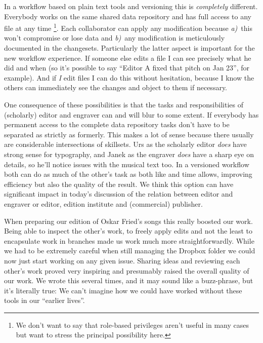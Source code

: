 \documentclass[11pt,a4paper]{article}
\begin{document}
In a workflow based on plain text tools and versioning this is \emph{completely} different.
Everybody works on the same shared data repository and has full access to any file at any
time%
\footnote{We don't want to say that role-based privileges aren't useful in many cases
but want to stress the principal possibility here.}.
Each collaborator can apply any modification because 
\mbox{\emph{a)} this} won't compromise or lose data and
\mbox{\emph{b)} any} modification is meticulously documented in the changesets.
Particularly the latter aspect is important for the new workflow experience. If someone
else edits a file I can see precisely what he did and when (so it's possible to say
“Editor A fixed that pitch on Jan 23”, for example). And if \emph{I} edit files I can
do this without hesitation, because I know the others can immediately see the changes
and object to them if necessary.

One consequence of these possibilities is that the tasks and responsibilities of
(scholarly) editor and engraver can and will blur to some extent. If everybody has
permanent access to the complete data repository tasks don't have to be separated as
strictly as formerly. This makes a lot of sense because there usually are considerable
intersections of skillsets. Urs as the scholarly editor \emph{does} have strong sense
for typography, and Janek as the engraver \emph{does} have a sharp eye on details, so
he'll notice issues with the musical text too. In a versioned workflow both can do
as much of the other's task as both like and time allows, improving efficiency but also
the quality of the result. We think this option can have significant impact in today's
discussion of the relation between editor and engraver or editor, edition institute and
(commercial) publisher.

When preparing our edition of Oskar Fried's songs this really boosted our work. Being
able to inspect the other's work, to freely apply edits and not the least to encapsulate
work in branches made us work much more straightforwardly. While we had to be
extremely careful when still managing the Dropbox folder we could now just start working
on any given issue. Sharing ideas and reviewing each other's work proved very inspiring
and presumably raised the overall quality of our work. We wrote this several times, and
it may sound like a buzz-phrase, but it's literally true: We can't imagine how we could
have worked without these tools in our “earlier lives”.
\end{document}
